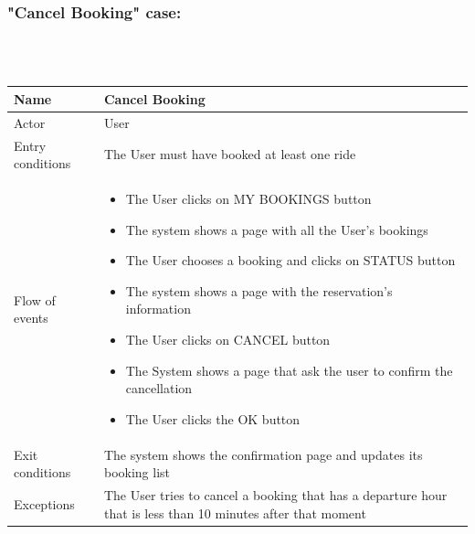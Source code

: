 \subsubsection{"Cancel Booking" case:}
\hfill \\
\\
\begin{tabular}{|p{3cm}|p{10cm}|}
\hline
Name & Cancel Booking\\
\hline
Actor & User\\
\hline
Entry conditions & The User must have booked at least one ride\\
\hline
Flow of events &
	\begin{itemize}
		\item The User clicks on MY BOOKINGS button
		\item The system shows a page with all the User's bookings
		\item The User chooses a booking and clicks on STATUS button
		\item The system shows a page with the reservation's information
		\item The User clicks on CANCEL button
		\item The System shows a page that ask the user to confirm the cancellation
		\item The User clicks the OK button
	\end{itemize}\\
\hline
Exit conditions & The system shows the confirmation page and updates its booking list\\
\hline
Exceptions & The User tries to cancel a booking that has a departure hour that is less than 10 minutes after that moment\\
\hline
\end {tabular}


\newpage

